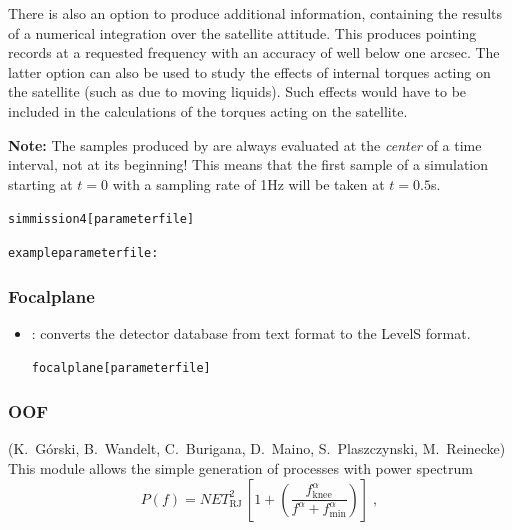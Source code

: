    There is also an option to produce additional information,
    containing the results of a numerical integration over the satellite
    attitude. This produces pointing records at a requested frequency
    with an accuracy of well below one arcsec. The latter option can also
    be used to study the effects of internal torques acting on the satellite
    (such as due to moving liquids). Such effects would have to be included
    in the calculations of the torques acting on the satellite.

{\bf Note:} The samples produced by  are always evaluated at
the {\em center} of a time interval, not at its beginning! This means that
the first sample of a simulation starting at $t=0$ with a sampling rate of 1Hz
will be taken at $t=0.5$s.

\begin{alltt}
simmission4 [parameter file]

example parameter file:


\end{alltt}

\subsubsection{Focalplane}

\begin{itemize}

\item {}: converts the detector database from text format to the
LevelS format.

\begin{alltt}
focalplane [parameter file]


\end{alltt}

\end{itemize}


\subsubsection{OOF}

(K.~G\'orski, B.~Wandelt, C.~Burigana, D.~Maino, S.~Plaszczynski,
 M.~Reinecke)\\
This module allows the simple generation of processes
with power spectrum
\[
  P(f)=NET_\mathrm{RJ}^2\,\left[1+
      \left(\frac{f_\mathrm{knee}^{\alpha}}
               {f^{\alpha}+f_\mathrm{min}^{\alpha}}\right)
  \right]\;,
\]

